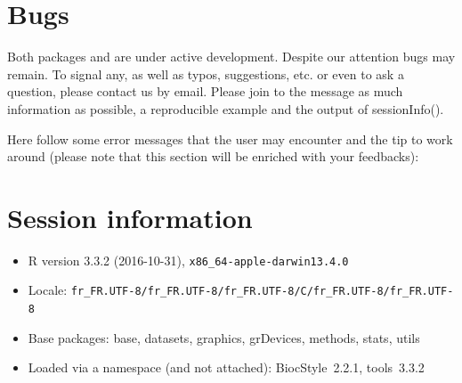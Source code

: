 \documentclass[12pt]{article}
\begin{document}



\section{Bugs}\label{sec:sessionBugs}

Both packages  and  are under active 
development. Despite our attention bugs may remain. To signal any, as well 
as typos, suggestions, etc. or even to ask a question, please contact us by 
email. Please join to the message as much information as possible, a 
reproducible example and the output of sessionInfo(). 

Here follow some error messages that the user may encounter and the tip to 
work around (please note that this section will be enriched with your 
feedbacks):





\section{Session information}\label{sec:sessionInfo}
\begin{itemize}\raggedright
  \item R version 3.3.2 (2016-10-31), \verb|x86_64-apple-darwin13.4.0|
  \item Locale: \verb|fr_FR.UTF-8/fr_FR.UTF-8/fr_FR.UTF-8/C/fr_FR.UTF-8/fr_FR.UTF-8|
  \item Base packages: base, datasets, graphics, grDevices, methods, stats,
    utils
  \item Loaded via a namespace (and not attached): BiocStyle~2.2.1, tools~3.3.2
\end{itemize}
\end{document}
